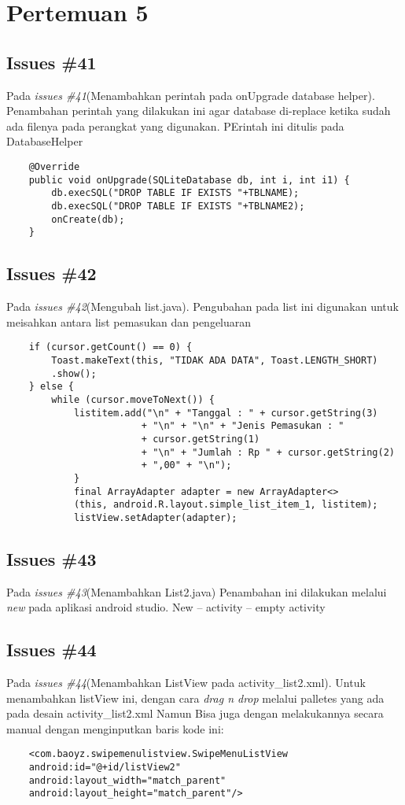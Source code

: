 \chapter{Pertemuan 5}

\section{Issues \#41}
Pada \textit{issues \#41}(Menambahkan perintah pada onUpgrade database helper). Penambahan perintah yang dilakukan ini agar database di-replace ketika sudah ada filenya pada perangkat yang digunakan. PErintah ini ditulis pada DatabaseHelper
\begin{verbatim}
    @Override
    public void onUpgrade(SQLiteDatabase db, int i, int i1) {
        db.execSQL("DROP TABLE IF EXISTS "+TBLNAME);
        db.execSQL("DROP TABLE IF EXISTS "+TBLNAME2);
        onCreate(db);
    }
\end{verbatim}

\section{Issues \#42}
Pada \textit{issues \#42}(Mengubah list.java). Pengubahan pada list ini digunakan untuk meisahkan antara list pemasukan dan pengeluaran 
\begin{verbatim}
    if (cursor.getCount() == 0) {
        Toast.makeText(this, "TIDAK ADA DATA", Toast.LENGTH_SHORT)
        .show();
    } else {
        while (cursor.moveToNext()) {
            listitem.add("\n" + "Tanggal : " + cursor.getString(3) 
                        + "\n" + "\n" + "Jenis Pemasukan : " 
                        + cursor.getString(1)
                        + "\n" + "Jumlah : Rp " + cursor.getString(2) 
                        + ",00" + "\n");
            }
            final ArrayAdapter adapter = new ArrayAdapter<>
            (this, android.R.layout.simple_list_item_1, listitem);
            listView.setAdapter(adapter);
\end{verbatim}

\section{Issues \#43}
Pada \textit{issues \#43}(Menambahkan List2.java) Penambahan ini dilakukan melalui \textit{new} pada aplikasi android studio.
New -- activity -- empty activity

\section{Issues \#44}
Pada \textit{issues \#44}(Menambahkan ListView pada activity\_list2.xml). Untuk menambahkan listView ini, dengan cara \textit{drag n drop} melalui palletes yang ada pada desain activity\_list2.xml
Namun Bisa juga dengan melakukannya secara manual dengan menginputkan baris kode ini:
\begin{verbatim}
    <com.baoyz.swipemenulistview.SwipeMenuListView
    android:id="@+id/listView2"
    android:layout_width="match_parent"
    android:layout_height="match_parent"/>
\end{verbatim}

